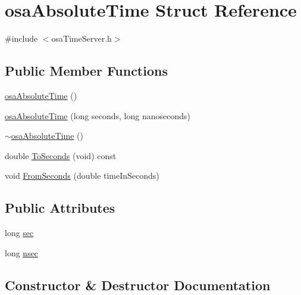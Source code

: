 \hypertarget{structosa_absolute_time}{}\section{osa\+Absolute\+Time Struct Reference}
\label{structosa_absolute_time}


{\ttfamily \#include $<$osa\+Time\+Server.\+h$>$}

\subsection*{Public Member Functions}
\begin{DoxyCompactItemize}
\item 
\hyperlink{structosa_absolute_time_a4c45c36514831a65da3a9cff5bf70be9}{osa\+Absolute\+Time} ()
\item 
\hyperlink{structosa_absolute_time_a58be692d7b5b555fb2855fcb5b14532d}{osa\+Absolute\+Time} (long seconds, long nanoseconds)
\item 
\hyperlink{structosa_absolute_time_ae1c2ef6be95c91d72806e4d1b0467957}{$\sim$osa\+Absolute\+Time} ()
\item 
double \hyperlink{structosa_absolute_time_a51c0657f31e0aa44f6a72d7e96b11598}{To\+Seconds} (void) const 
\item 
void \hyperlink{structosa_absolute_time_ab333f8c4a8807ad91d45428be471ee94}{From\+Seconds} (double time\+In\+Seconds)
\end{DoxyCompactItemize}
\subsection*{Public Attributes}
\begin{DoxyCompactItemize}
\item 
long \hyperlink{structosa_absolute_time_a64e52ede3b458f455adc45bd5e07bd36}{sec}
\item 
long \hyperlink{structosa_absolute_time_a2f5e9806cf523d92b2c409687e75b214}{nsec}
\end{DoxyCompactItemize}


\subsection{Constructor \& Destructor Documentation}
\hypertarget{structosa_absolute_time_a4c45c36514831a65da3a9cff5bf70be9}{}
